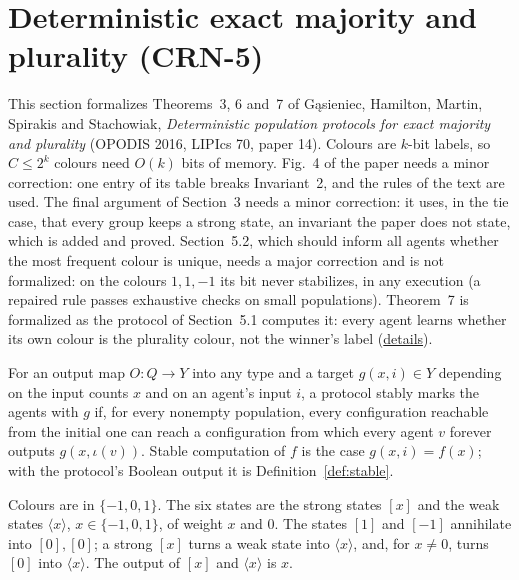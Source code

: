 \section{Deterministic exact majority and plurality (CRN-5)}\label{sec:ghmss-exact-majority}
This section formalizes Theorems~3, 6 and~7 of Gąsieniec, Hamilton, Martin, Spirakis and
Stachowiak, \emph{Deterministic population protocols for exact majority and plurality} (OPODIS
2016, LIPIcs 70, paper 14). Colours are $k$-bit labels, so $C \le 2^k$ colours need $O(k)$ bits of
memory. Fig.~4 of the paper needs a minor correction: one entry of its table breaks Invariant~2,
and the rules of the text are used. The final argument of Section~3 needs a minor correction: it
uses, in the tie case, that every group keeps a strong state, an invariant the paper does not
state, which is added and proved. Section~5.2, which should inform all agents whether the most
frequent colour is unique, needs a major correction and is not formalized: on the colours
$1, 1, -1$ its bit never stabilizes, in any execution (a repaired rule passes exhaustive checks on
small populations). Theorem~7 is formalized as the protocol of Section~5.1 computes it: every
agent learns whether its own colour is the plurality colour, not the winner's label
(\href{https://github.com/formal-dynamics/leanamics/blob/main/crn/FORMALIZATION_DIFFERENCES.md#deterministic-exact-majority-and-plurality-exactmajority-crn-5}{details}).

\begin{definition}\label{def:em-marks}
\leanok{}
For an output map $O : Q \to Y$ into any type and a target $g(x, i) \in Y$ depending on the input
counts $x$ and on an agent's input $i$, a protocol stably marks the agents with $g$ if, for every
nonempty population, every configuration reachable from the initial one can reach a configuration
from which every agent $v$ forever outputs $g(x, \iota(v))$. Stable computation of $f$ is the case
$g(x, i) = f(x)$; with the protocol's Boolean output it is Definition~\ref{def:stable}.
\end{definition}

\begin{definition}\label{def:em-static}
\leanok{}
Colours are in $\{-1, 0, 1\}$. The six states are the strong states $[x]$ and the weak states
$\langle x \rangle$, $x \in \{-1, 0, 1\}$, of weight $x$ and $0$. The states $[1]$ and $[-1]$
annihilate into $[0], [0]$; a strong $[x]$ turns a weak state into $\langle x \rangle$, and, for
$x \ne 0$, turns $[0]$ into $\langle x \rangle$. The output of $[x]$ and $\langle x \rangle$ is
$x$.
\end{definition}

